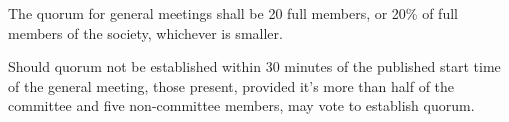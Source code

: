 \begin{clause}
  The quorum for general meetings shall be 20 full members, or 20\% of full members of the society, whichever is smaller.
\end{clause}

\begin{subclause}
  Should quorum not be established within 30 minutes of the published start time of the general meeting, those present, provided it's more than half of the committee and five non-committee members, may vote to establish quorum.
\end{subclause}

